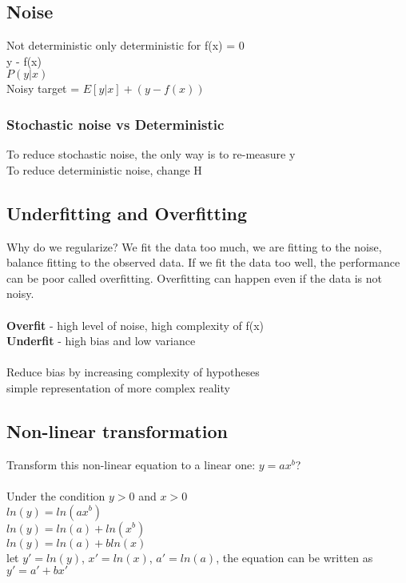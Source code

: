 \documentclass[11pt]{article}
\begin{document}
\subsection*{Noise}
Not deterministic only deterministic for f(x) = 0 \\
y - f(x)\\
$P(y | x)$\\
Noisy target = $E[y|x] + (y - f(x))$
\\
\subsubsection*{Stochastic noise vs Deterministic}

To reduce stochastic noise, the only way is to re-measure y
\\
To reduce deterministic noise, change H
\subsection*{Underfitting and Overfitting}
Why do we regularize?
We fit the data too much, we are fitting to the noise, balance fitting to the observed data. If we fit the data too well, the performance can be poor called overfitting. Overfitting can happen even if the data is not noisy.\\\\
\textbf{Overfit} - high level of noise, high complexity of f(x)\\
\textbf{Underfit} - high bias and low variance\\\\
Reduce bias by increasing complexity of hypotheses\\
simple representation of more complex reality
\subsection*{Non-linear transformation}
Transform this non-linear equation to a linear one: $y = ax^b$?
\\\\
 Under the condition $y>0$ and $x>0$
 \\
$ln(y)=ln(ax^b)$
\\
$ln(y)=ln(a)+ln(x^b)$
\\
$ln(y)=ln(a)+bln(x)$
\\
let $y'=ln(y)$, $x'=ln(x)$, $a'=ln(a)$, the equation can be written as $y'=a'+bx'$
\end{document}
